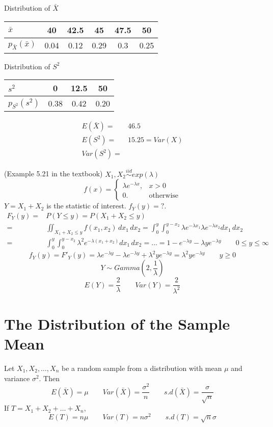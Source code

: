 \begin{exmp}
Distribution of $\bar{X}$
\begin{center}
\begin{tabular}{|l|c|c|c|c|c|}
\hline
$\bar{x}$ & 40 & 42.5 & 45 & 47.5 & 50\\
\hline
$p_{\bar{X}}(\bar{x})$ & 0.04 & 0.12 & 0.29 & 0.3 & 0.25 \\
\hline
\end{tabular}
\end{center}

Distribution of $S^2$
\begin{center}
\begin{tabular}{|l|c|c|c|}
\hline
$s^2$ & 0 & 12.5 & 50\\
\hline
$p_{S^2}(s^2)$ & 0.38 & 0.42 & 0.20 \\
\hline
\end{tabular}
\end{center}
\begin{align*}
E(\bar{X})=& 46.5 \\
E(S^2)=& 15.25 = Var(X) \\
Var(S^2)=&
\end{align*}
\end{exmp}

\begin{exmp}
(Example 5.21 in the textbook)
$X_1,X_2 \overset{iid}{\sim}exp(\lambda)$
\[f(x)=\begin{cases}
\lambda e^{-\lambda x}, 	& x >0\\
0. &\text{otherwise}
\end{cases}\]
$Y=X_1+X_2$ is the statistic of interest. $f_Y(y)=?$.
\begin{align*}
F_Y(y)=&P(Y \leq y)=P(X_1+X_2\leq y) \\
=&\iint_{X_1+X_2\leq y} f(x_1,x_2) \,dx_1 \,dx_2 =\int_0^y \int_0^{y-x_2} \lambda e^{-\lambda x_1} \lambda e^{-\lambda x_2} dx_1 \, dx_2 \\
=& \int_0^y \int_0^{y-x_2} \lambda^2 e^{-\lambda(x_1+x_2)} dx_1 \, dx_2= \dots = 1-e^{-\lambda y}- \lambda y e^{-\lambda y} \qquad 0\leq y \leq \infty
\end{align*}
\[f_Y(y)=F'_Y(y)=\lambda e^{-\lambda y} -\lambda e^{-\lambda y}+\lambda^2 y e^{-\lambda y} =\lambda^2 y e^{-\lambda y} \qquad y \geq 0 \]
\[Y\sim Gamma(2,\frac{1}{\lambda})\]
\[E(Y)=\frac{2}{\lambda} \qquad Var(Y)=\frac{2}{\lambda^2}\]
\end{exmp}

\section{The Distribution of the Sample Mean}
\begin{prop}
Let $X_1, X_2, \dots , X_n$ be a random sample from a distribution with mean $\mu$ and variance $\sigma^2$. Then 
\[E(\bar{X})=\mu \qquad  Var(\bar{X})=\frac{\sigma^2}{n} \qquad s.d(\bar{X})=\frac{\sigma}{\sqrt{n}}\]
If $T=X_1+ X_2+ \dots + X_n$,
\[E(T)=n \mu \qquad  Var(T)=n\sigma^2 \qquad s.d(T)=\sqrt{n}\sigma\]
\end{prop}

